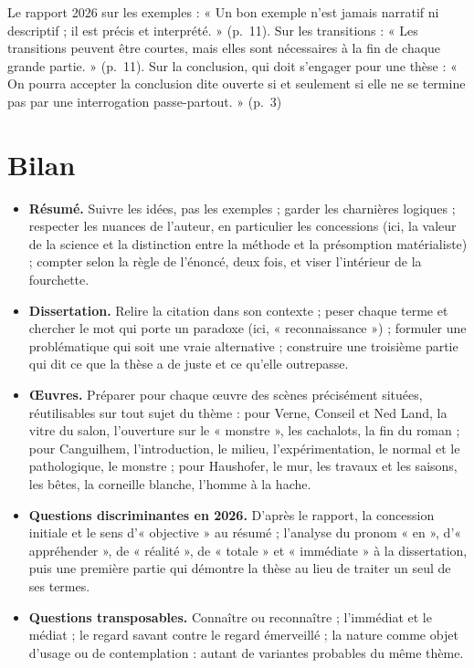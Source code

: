 \documentclass[11pt,a4paper]{article}
\providecommand{\tightlist}{\setlength{\itemsep}{0pt}\setlength{\parskip}{0pt}}
\begin{document}
\begin{jury}

Le rapport 2026 sur les exemples : « Un bon exemple n'est jamais narratif ni descriptif ; il est précis et interprété. » (p.~11). Sur les transitions : « Les transitions peuvent être courtes, mais elles sont nécessaires à la fin de chaque grande partie. » (p.~11). Sur la conclusion, qui doit s'engager pour une thèse : « On pourra accepter la conclusion dite ouverte si et seulement si elle ne se termine pas par une interrogation passe-partout. » (p.~3)

\end{jury}

\hypertarget{bilan}{%
\section{Bilan}\label{bilan}}

\begin{itemize}
\tightlist
\item
  \textbf{Résumé.} Suivre les idées, pas les exemples ; garder les charnières logiques ; respecter les nuances de l'auteur, en particulier les concessions (ici, la valeur de la science et la distinction entre la méthode et la présomption matérialiste) ; compter selon la règle de l'énoncé, deux fois, et viser l'intérieur de la fourchette.
\item
  \textbf{Dissertation.} Relire la citation dans son contexte ; peser chaque terme et chercher le mot qui porte un paradoxe (ici, « reconnaissance ») ; formuler une problématique qui soit une vraie alternative ; construire une troisième partie qui dit ce que la thèse a de juste et ce qu'elle outrepasse.
\item
  \textbf{Œuvres.} Préparer pour chaque œuvre des scènes précisément situées, réutilisables sur tout sujet du thème : pour Verne, Conseil et Ned Land, la vitre du salon, l'ouverture sur le « monstre », les cachalots, la fin du roman ; pour Canguilhem, l'introduction, le milieu, l'expérimentation, le normal et le pathologique, le monstre ; pour Haushofer, le mur, les travaux et les saisons, les bêtes, la corneille blanche, l'homme à la hache.
\item
  \textbf{Questions discriminantes en 2026.} D'après le rapport, la concession initiale et le sens d'« objective » au résumé ; l'analyse du pronom « en », d'« appréhender », de « réalité », de « totale » et « immédiate » à la dissertation, puis une première partie qui démontre la thèse au lieu de traiter un seul de ses termes.
\item
  \textbf{Questions transposables.} Connaître ou reconnaître ; l'immédiat et le médiat ; le regard savant contre le regard émerveillé ; la nature comme objet d'usage ou de contemplation : autant de variantes probables du même thème.
\end{itemize}
\end{document}
